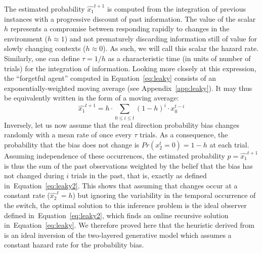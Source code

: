 \documentclass[12pt,english]{article}%
\newcommand{\eql}[1]{\begin{equation}#1\end{equation}}
\newcommand{\citet}[1]{\textcite{#1}}
\newcommand{\seeEq}[1]{Equation~\ref{eq:#1}}
\newcommand{\seeApp}[1]{Appendix~\ref{app:#1}}
\begin{document}
The estimated probability $\hat{x_1}^{t+1}$ is computed
from the integration of previous instances
with a progressive discount of past information.
The value of the scalar $h$ represents
a compromise between responding rapidly
to changes in the environment ($h \approx 1$) and
not prematurely discarding information still of value
for slowly changing contexts  ($h \approx 0$).
As such, we will call this scalar the hazard rate.
Similarly, one can define $\tau = 1 / h$ as
a characteristic time (in units of number of trials)
for the integration of information.
Looking more closely at this expression,
the ``forgetful agent'' computed in \seeEq{leaky}
consists of an exponentially-weighted moving average (see \seeApp{leaky}).
It may thus be equivalently written in the form of a moving average:
\eql{
\hat{x_1}^{t+1} = h \cdot \sum_{0\leq i \leq t} (1 - h)^{i} \cdot x_0^{t-i}
\label{eq:leaky2}}
Inversely, let us now assume that
the real direction probability bias changes randomly with a mean rate of once
every $\tau$ trials.
As a consequence, the probability that the bias does not change is $Pr(x_2^t=0)=1-h$ at each trial.
Assuming independence of these occurrences, the estimated probability $p=\hat{x_1}^{t+1}$ is thus the sum
of the past observations weighted by the belief that the bias has not changed during $i$ trials in the past, that is, exactly as defined in~\seeEq{leaky2}.
This shows that
assuming that changes occur at a constant rate ($\hat{x_2}^t=h$)
but ignoring the variability in the temporal occurrence of the switch,
the optimal solution to this inference problem is the
ideal observer defined in~\seeEq{leaky2},
which finds an online recursive solution in~\seeEq{leaky}.
We therefore proved here that the heuristic derived from~\citet{Anderson2006}
is an ideal inversion of the two-layered generative model
which assumes a constant hazard rate for the probability bias.
\end{document}

